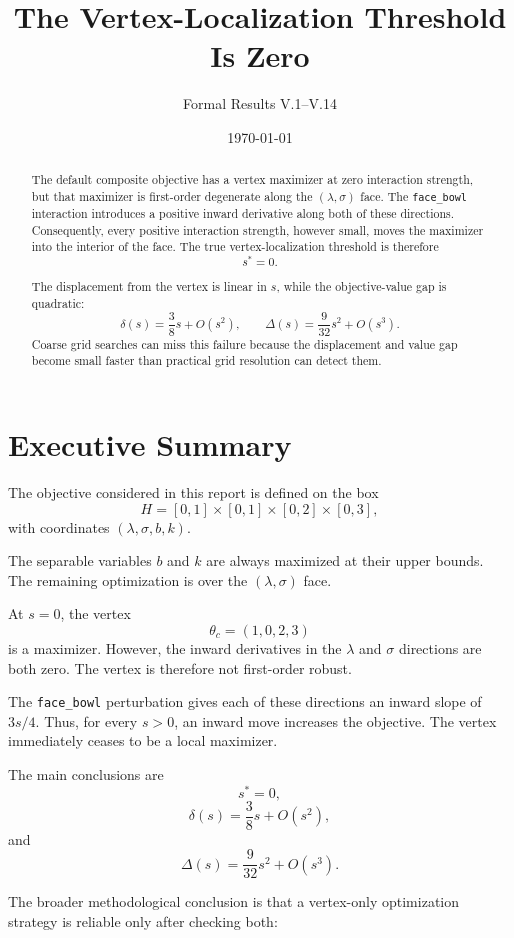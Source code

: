 \documentclass[11pt]{article}
\title{\textbf{The Vertex-Localization Threshold Is Zero}}
\author{Formal Results V.1--V.14}
\date{\today}
\theoremstyle{remark}
\begin{document}
\maketitle

\begin{abstract}
The default composite objective has a vertex maximizer at zero interaction
strength, but that maximizer is first-order degenerate along the
$(\lambda,\sigma)$ face. The \texttt{face\_bowl} interaction introduces a
positive inward derivative along both of these directions. Consequently, every
positive interaction strength, however small, moves the maximizer into the
interior of the face. The true vertex-localization threshold is therefore
\[
s^*=0.
\]

The displacement from the vertex is linear in $s$, while the objective-value
gap is quadratic:
\[
\delta(s)=\frac{3}{8}s+O(s^2),
\qquad
\Delta(s)=\frac{9}{32}s^2+O(s^3).
\]
Coarse grid searches can miss this failure because the displacement and value
gap become small faster than practical grid resolution can detect them.
\end{abstract}

\tableofcontents

\section{Executive Summary}

The objective considered in this report is defined on the box
\[
H=[0,1]\times[0,1]\times[0,2]\times[0,3],
\]
with coordinates $(\lambda,\sigma,b,k)$.

The separable variables $b$ and $k$ are always maximized at their upper
bounds. The remaining optimization is over the $(\lambda,\sigma)$ face.

At $s=0$, the vertex
\[
\theta_c=(1,0,2,3)
\]
is a maximizer. However, the inward derivatives in the $\lambda$ and
$\sigma$ directions are both zero. The vertex is therefore not
first-order robust.

The \texttt{face\_bowl} perturbation gives each of these directions an inward
slope of $3s/4$. Thus, for every $s>0$, an inward move increases the objective.
The vertex immediately ceases to be a local maximizer.

The main conclusions are
\[
\boxed{s^*=0},
\]
\[
\boxed{\delta(s)=\frac{3}{8}s+O(s^2)},
\]
and
\[
\boxed{\Delta(s)=\frac{9}{32}s^2+O(s^3)}.
\]

The broader methodological conclusion is that a vertex-only optimization
strategy is reliable only after checking both:
\end{document}
